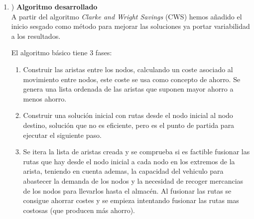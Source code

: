 \documentclass[11pt]{article} %
\begin{document}
\begin{enumerate}
   \item) \textbf{Algoritmo desarrollado}\\[0.2cm]
A partir del algoritmo \textit{Clarke and Wright Savings} (CWS) hemos añadido el inicio sesgado como método para mejorar las soluciones ya portar variabilidad a los resultados.

El algoritmo básico tiene 3 fases:
\renewcommand{\labelenumii}{\arabic{enumii}}
	\begin{enumerate}
		\item Construir las aristas entre los nodos, calculando un coste asociado al movimiento entre nodos, este coste se usa como concepto de ahorro. Se genera una lista ordenada de las aristas que suponen mayor ahorro a menos ahorro.
		\item Construir una solución inicial con rutas desde el nodo inicial al nodo destino, solución que no es eficiente, pero es el punto de partida para ejecutar el siguiente paso.
		\item Se itera la lista de aristas creada y se comprueba si es factible fusionar las rutas que hay desde el nodo inicial a cada nodo en los extremos de la arista, teniendo en cuenta ademas, la capacidad del vehiculo para abastecer la demanda de los nodos y la necesidad de recoger mercancias de los nodos para llevarlos hasta el almacén. Al fusionar las rutas se consigue ahorrar costes y se empieza intentando fusionar las rutas mas costosas (que producen más ahorro).
	\end{enumerate}


\end{enumerate}
\end{document}
